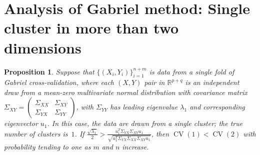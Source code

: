 \documentclass[12pt]{article}
\newtheorem{proposition}{Proposition}
\newcommand{\CV}{\operatorname{CV}}
\newcommand{\R}{\mathbb{R}}
\begin{document}



\section{Analysis of Gabriel method: Single cluster in more than two dimensions}
\label{sec:single-general-dim}

\begin{proposition}
Suppose that $\{ (X_i, Y_i) \}_{i=1}^{n + m}$ is data from a single fold
of Gabriel cross-validation, where each $(X,Y)$ pair in $\R^{p+q}$ is an
independent draw from a mean-zero multivariate normal distribution with 
covariance matrix $\Sigma_{XY}= \left( \begin{smallmatrix} \Sigma_{XX} & \Sigma_{XY} \\ 
 \Sigma_{YX} & \Sigma_{YY} \end{smallmatrix}\right)$, with $\Sigma_{YY}$ has leading 
eigenvalue $\lambda_1$ and corresponding eigenvector $u_1$. In this case, the data are drawn
from a single cluster; the true number of clusters is~$1$.  If  $\frac{\sqrt{\lambda_1}}{2}
 > \frac{u^T_1\Sigma_{YX}\Sigma_{XY}u_1}{\sqrt{u^T_1\Sigma_{YX} \Sigma_{XX} \Sigma_{XY} u_1}}$,
then $\CV(1) < \CV(2)$ with probability tending to one as $m$ and $n$ increase.
\end{proposition}
\end{document}
